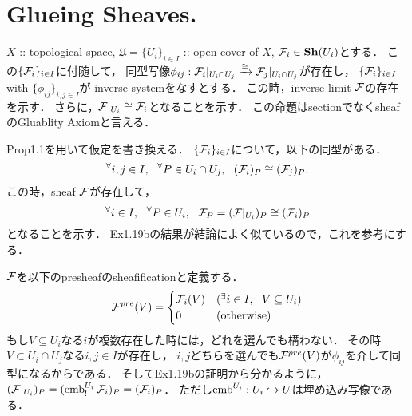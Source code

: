 \documentclass[a4paper]{jsarticle}
\newcommand{\Sh}{\mathbf{Sh}}
\begin{document}
    \subsection{ }

\section{Glueing Sheaves.} %
    $X$ :: topological space, 
    $\mathfrak{U}=\{U_i\}_{i \in I}$ :: open cover of $X$,
    $\shF_i \in \Sh(U_i)$とする．
    この$\{\mathcal{F}_i\}_{i \in I}$に付随して，
    同型写像$\phi_{ij}: \mathcal{F}_i|_{U_i \cap U_j} \xrightarrow{\cong} \mathcal{F}_j|_{U_i \cap U_j}$が存在し，
    $\{\mathcal{F}_i\}_{i \in I}$ with $\{\phi_{ij}\}_{i,j \in I}$が
    inverse systemをなすとする．
    この時，inverse limit $\mathcal{F}$の存在を示す．
    さらに，$\mathcal{F}|_{U_i} \cong \mathcal{F}_i$となることを示す．
    この命題はsectionでなくsheafのGluablity Axiomと言える．
 
    Prop1.1を用いて仮定を書き換える．
    $\{\mathcal{F}_i\}_{i \in I}$について，以下の同型がある．
    \[ {}^{\forall} i,j \in I,~~ {}^{\forall} P \in U_i \cap U_j,~~ (\mathcal{F}_i)_P \cong (\mathcal{F}_j)_P. \]
    この時，sheaf $\mathcal{F}$が存在して，
    \[ {}^{\forall} i \in I,~~ {}^{\forall} P \in U_i,~~ \mathcal{F}_P=(\mathcal{F}|_{U_i})_P \cong (\mathcal{F}_i)_P \]
    となることを示す．
    Ex1.19bの結果が結論によく似ているので，これを参考にする．

    $\mathcal{F}$を以下のpresheafのsheafificationと定義する．
    \[
        \mathcal{F}^{pre}(V)=
        \begin{cases}{}
            \mathcal{F}_i(V) & ({}^{\exists} i \in I,~~ V \subseteq U_i) \\
            0 & (\text{otherwise})
        \end{cases}
    \]
    もし$V \subseteq U_i$なる$i$が複数存在した時には，どれを選んでも構わない．
    その時$V \subset U_i \cap U_j$なる$i,j \in I$が存在し，
    $i,j$どちらを選んでも$\mathcal{F}^{pre}(V)$が$\phi_{ij}$を介して同型になるからである．
    そしてEx1.19bの証明から分かるように，$(\mathcal{F}|_{U_i})_P=(\operatorname{emb}^{U_i}_! \mathcal{F}_i)_P=(\mathcal{F}_i)_P$．
    ただし$\operatorname{emb}^{U_i}: U_i \hookrightarrow U$は埋め込み写像である．
\end{document}

